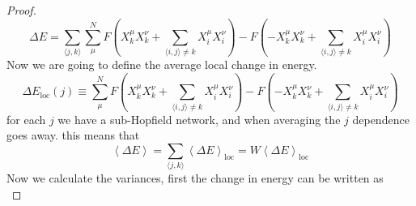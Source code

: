 \documentclass{article}
\theoremstyle{definition}
\theoremstyle{remark}
\newcommand{\avg}[1]{\left \langle #1 \right \rangle}
\begin{document}
    \begin{proof}
        \begin{equation}
            \Delta E=\sum_{\langle j,k\rangle}\sum_\mu^N
            F\left(X^\mu_kX^\nu_k+
                \sum_{\langle i,j\rangle\neq k}X^\mu_iX^\nu_i
            \right)-
            F\left(-X^\mu_kX^\nu_k+
                \sum_{\langle i,j\rangle\neq k}X^\mu_iX^\nu_i
            \right)
        \end{equation}
        Now we are going to define the average local change in energy. 
        \begin{equation}
        \Delta E_\textrm{loc}(j)\equiv
        \sum_\mu^N
            F\left(X^\mu_kX^\nu_k+
                \sum_{\langle i,j\rangle\neq k}X^\mu_iX^\nu_i
            \right)-
            F\left(-X^\mu_kX^\nu_k+
                \sum_{\langle i,j\rangle\neq k}X^\mu_iX^\nu_i
            \right)
        \end{equation}
        for each $j$ we have a sub-Hopfield network, and when averaging the $j$ dependence goes away.
        this means that 
        \begin{equation}
            \avg{\Delta E}= \sum_{\langle j,k\rangle}
            \avg{\Delta E}_\textrm{loc}=W \avg{\Delta E}_\textrm{loc}
        \end{equation}
        Now we calculate the variances, first the change in energy can be written as
        \begin{equation}
        \label{eq:deltaE^2}

\end{equation}
\end{proof}
\end{document}
